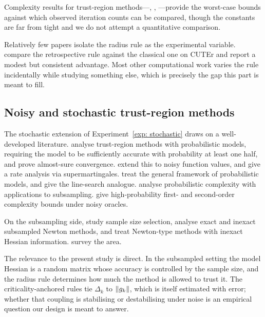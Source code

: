 \documentclass[11pt]{article}
\theoremstyle{plain}
\theoremstyle{definition}
\theoremstyle{remark}
\numberwithin{equation}{section}
\begin{document}
Complexity results for trust-region methods---\citet{GrapigliaYuanYuan15},
\citet{CurtisLubbertsRobinson2018}, \citet{CurtisRobinsonSamadi2017}---provide the worst-case
bounds against which observed iteration counts can be compared, though the constants are far
from tight and we do not attempt a quantitative comparison.

Relatively few papers isolate the radius rule as the experimental variable.
\citet{BastMalmMoufToinToma10} compare the retrospective rule against the classical one on
CUTEr and report a modest but consistent advantage. Most other computational work varies the
rule incidentally while studying something else, which is precisely the gap this part is meant
to fill.

\subsection{Noisy and stochastic trust-region methods}
\label{sec: stochastic lit}

The stochastic extension of Experiment~\ref{exp: stochastic} draws on a well-developed
literature. \citet{BandeiraScheinbergVicente14} analyse trust-region methods with probabilistic
models, requiring the model to be sufficiently accurate with probability at least one half, and
prove almost-sure convergence. \citet{ChenMenickellyScheinberg18} extend this to noisy function
values, and \citet{BlanchetCartisMenickellyScheinberg19} give a rate analysis via
supermartingales. \citet{CartisScheinberg18} treat the general framework of probabilistic
models, and \citet{BerahasCaoScheinberg21} give the line-search analogue.
\citet{BellaviaGurioliMoriniToint2022} analyse probabilistic complexity with applications to
subsampling. \citet{CaoBerahasScheinberg2023} give high-probability first- and second-order
complexity bounds under noisy oracles.

On the subsampling side, \citet{ByrdChinNoceWu12} study sample size selection,
\citet{BollByrdNoce18SIAM, BollByrdNoce18IMA} analyse exact and inexact subsampled Newton
methods, and \citet{XuRoosMaho20MP, XuRoosMaho20SIAM} treat Newton-type methods with inexact
Hessian information. \citet{BottouCurtisNocedal18} survey the area.

The relevance to the present study is direct. In the subsampled setting the model Hessian is a
random matrix whose accuracy is controlled by the sample size, and the radius rule determines
how much the method is allowed to trust it. The criticality-anchored rules tie $\Delta_k$ to
$\left \lVert g_k \right \rVert$, which is itself estimated with error; whether that coupling is stabilising or
destabilising under noise is an empirical question our design is meant to answer.
\end{document}
